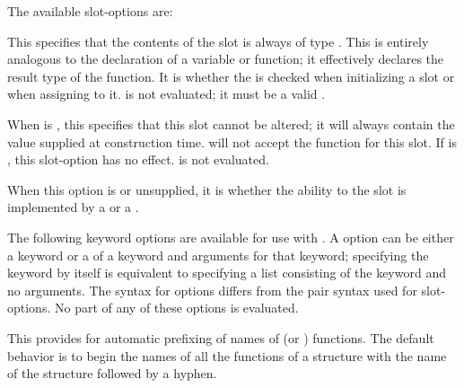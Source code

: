   
The available slot-options are:
\beginlist
                   
This specifies that the contents of the
slot is always of type .  This is entirely
analogous to the declaration of a variable or function; it
effectively declares the result type of the  function.  
It is  whether the  is checked 
    when initializing a slot
 or when assigning to it.
 is not evaluated; it must be a valid .

                   
When  is ,
this specifies that this slot cannot be
altered; it will always contain the value supplied at construction time.
 will not accept the  function for this slot.
If  is , this slot-option has no effect.
 is not evaluated.

When this option is  or unsupplied,
it is  whether the ability to 
the slot is implemented by a  or a .

\endlist

The following keyword options are available for use with .  
A  option can be either a keyword or a 
of a keyword and arguments for that keyword; 
specifying the keyword by itself is equivalent to specifying a list consisting of
the keyword and no arguments.
The syntax for  options differs from the pair syntax 
used for slot-options.  No part of any of these options is evaluated.
\beginlist


This provides for automatic prefixing of names of  (or ) functions.
The default behavior is to begin the names of all the  functions of
a structure with the name of the structure followed by a hyphen.

